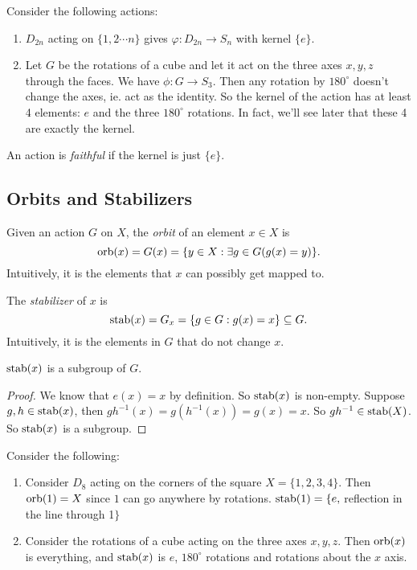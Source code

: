 \documentclass[a4paper]{article}
\begin{document}
  \begin{eg}
    Consider the following actions:
    \begin{enumerate}
      \item $D_{2n}$ acting on $\{1, 2\cdots n\}$ gives $\varphi: D_{2n}\to S_n$ with kernel $\{e\}$.
      \item Let $G$ be the rotations of a cube and let it act on the three axes $x, y, z$ through the faces. We have $\phi: G\to S_3$. Then any rotation by $180^\circ$ doesn't change the axes, ie. act as the identity. So the kernel of the action has at least 4 elements: $e$ and the three $180^\circ$ rotations. In fact, we'll see later that these 4 are exactly the kernel.
    \end{enumerate}
  \end{eg}

  \begin{defi}
    An action is \emph{faithful} if the kernel is just $\{e\}$.
  \end{defi}

  \subsection{Orbits and Stabilizers}
  \begin{defi}
    Given an action $G$ on $X$, the \emph{orbit} of an element $x\in X$ is 
    \[
      \operatorname{orb} (x) = G(x) = \{y\in X: \exists g\in G(g(x) = y)\}.
    \]
    Intuitively, it is the elements that $x$ can possibly get mapped to.
  \end{defi}
  \begin{defi}
    The \emph{stabilizer} of $x$ is
    \[
      \operatorname{stab}(x) = G_x = \{g\in G: g(x) = x\}\subseteq G.
    \]
    Intuitively, it is the elements in $G$ that do not change $x$.
  \end{defi}

  \begin{lemma}
    $\operatorname{stab}(x)$ is a subgroup of $G$.
  \end{lemma}

  \begin{proof}
    We know that $e(x) = x$ by definition. So $\operatorname{stab}(x)$ is non-empty. Suppose $g, h\in \operatorname{stab}(x)$, then $gh^{-1}(x) = g(h^{-1}(x)) = g(x) = x$. So $gh^{-1}\in \operatorname{stab} (X)$. So $\operatorname{stab} (x)$ is a subgroup.
  \end{proof}

  \begin{eg}
    Consider the following:
    \begin{enumerate}
      \item Consider $D_8$ acting on the corners of the square $X = \{1, 2, 3, 4\}$. Then $\operatorname{orb}(1) = X$ since $1$ can go anywhere by rotations. $\operatorname{stab}(1) = \{e, $ reflection in the line through 1$\}$
      \item Consider the rotations of a cube acting on the three axes $x, y, z$. Then $\operatorname{orb}(x)$ is everything, and $\operatorname{stab}(x)$ is $e$, $180^\circ$ rotations and rotations about the $x$ axis.
    \end{enumerate}
  \end{eg}
\end{document}
